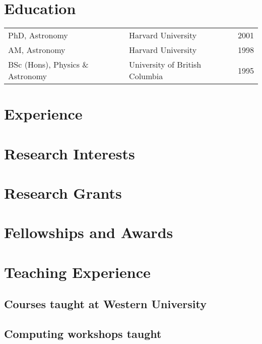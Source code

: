 \documentclass[12pt]{article}
\begin{document}
\maketitle

\section{Education}
\begin{tabularx}{\textwidth}{lXr}
PhD, Astronomy & Harvard University & 2001\\
AM, Astronomy & Harvard University & 1998\\
BSc (Hons),  Physics \& Astronomy & University of British Columbia&1995\\
\end{tabularx}

\section{Experience} 


\section{Research Interests}



\section{Research Grants}



\clearpage

\section{Fellowships and Awards}


\section{Teaching Experience}

\subsection{Courses taught at Western University}


\subsection{Computing workshops taught} 

\end{document}
